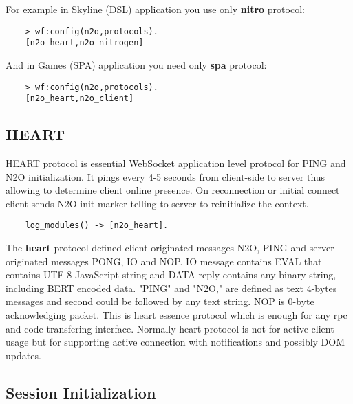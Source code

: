 For example in Skyline (DSL) application you use only {\bf nitro} protocol:

\vspace{1\baselineskip}
\begin{lstlisting}
    > wf:config(n2o,protocols).
    [n2o_heart,n2o_nitrogen]
\end{lstlisting}
\vspace{1\baselineskip}

And in Games (SPA) application you need only {\bf spa} protocol:

\vspace{1\baselineskip}
\begin{lstlisting}
    > wf:config(n2o,protocols).
    [n2o_heart,n2o_client]
\end{lstlisting}
\vspace{1\baselineskip}

\newpage
\subsection{HEART}

HEART protocol is essential WebSocket application level protocol for PING and N2O initialization.
It pings every 4-5 seconds from client-side to server thus allowing to
determine client online presence. On reconnection or initial connect
client sends N2O init marker telling to server to reinitialize the context.



\vspace{1\baselineskip}
\begin{lstlisting}
    log_modules() -> [n2o_heart].
\end{lstlisting}
\vspace{1\baselineskip}

The {\bf heart} protocol defined client originated messages N2O, PING
and server originated messages PONG, IO and NOP. IO message contains EVAL
that contains UTF-8 JavaScript string and DATA reply contains any
binary string, including BERT encoded data. "PING" and "N2O," are
defined as text 4-bytes messages and second could be followed by
any text string. NOP is 0-byte acknowledging packet.
This is heart essence protocol which is enough for any rpc and code
transfering interface. Normally heart protocol is not for active
client usage but for supporting active connection with notifications
and possibly DOM updates.

\subsection*{Session Initialization}


